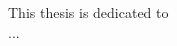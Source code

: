 {%
\thispagestyle{empty}%
\begin{vplace}[0.7]
\mbox{}\hfill This thesis is dedicated to \vspace{1pc}\\
\mbox{}\hfill {\large ...}
\end{vplace}%
}
